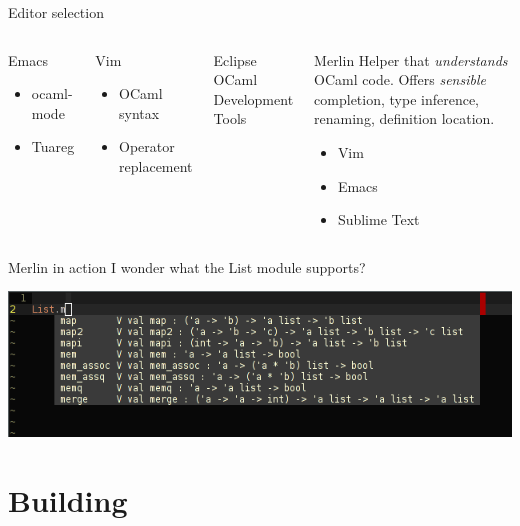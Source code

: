 \documentclass{beamer}
\begin{document}
\begin{frame}{Editor selection}
  \begin{columns}[t]
    \begin{block}{Emacs}
      \begin{itemize}
        \item ocaml-mode
        \item Tuareg
      \end{itemize}
    \end{block}
    \begin{block}{Vim}
      \begin{itemize}
        \item OCaml syntax
        \item Operator replacement
      \end{itemize}
    \end{block}
    \begin{block}{Eclipse}
      OCaml Development Tools
    \end{block}
    \begin{block}{Merlin}
      Helper that \emph{understands} OCaml code. Offers \emph{sensible}
      completion, type inference, renaming, definition location.
      \begin{itemize}
        \item Vim
        \item Emacs
        \item Sublime Text
      \end{itemize}
    \end{block}
  \end{columns}
\end{frame}

\begin{frame}{Merlin in action}
  I wonder what the List module supports?

  \pause
  \includegraphics[width=\textwidth]{vim_complete}
\end{frame}

\section{Building}
\end{document}
